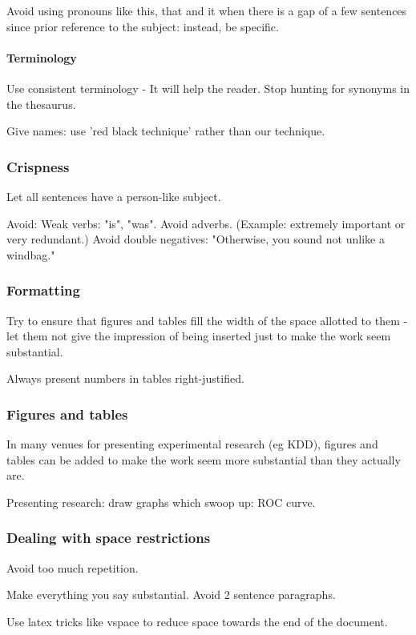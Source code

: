 \documentclass[oneside, article]{memoir}
\begin{document}
Avoid using pronouns like this, that and it when there is a gap of a few sentences since prior reference to the subject: instead, be specific.

\paragraph*{Terminology}
Use consistent terminology - It will help the reader. Stop hunting for synonyms in the thesaurus.

Give names: use 'red black technique' rather than our technique.


\subsubsection{Crispness}
Let all sentences have a person-like subject.

Avoid:
\subitem Weak verbs: "is", "was".
\subitem Avoid adverbs. (Example: extremely important or very redundant.)
\subitem Avoid double negatives: "Otherwise, you sound not unlike a windbag."

\subsubsection{Formatting}
Try to ensure that figures and tables fill the width of the space allotted to them - let them not give the impression of being inserted just to make the work seem substantial.

Always present numbers in tables right-justified.

\subsubsection{Figures and tables}
In many venues for presenting experimental research (eg KDD), figures and tables can be added to make the work seem more substantial than they actually are.

Presenting research: draw graphs which swoop up: ROC curve.

\subsubsection{Dealing with space restrictions}
Avoid too much repetition.

Make everything you say substantial. Avoid 2 sentence paragraphs.

Use latex tricks like vspace to reduce space towards the end of the document.
\end{document}

